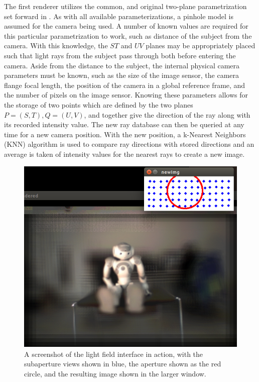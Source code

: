 \documentclass[12pt]{report}
\begin{document}
The first renderer utilizes the common, and original two-plane parametrization set forward in \cite{Levoy96}. As with all available parameterizations, a pinhole model is assumed for the camera being used. A number of known values are required for this particular parametrization to work, such as distance of the subject from the camera. With this knowledge, the $ST$ and $UV$ planes may be appropriately placed such that light rays from the subject pass through both before entering the camera. Aside from the distance to the subject, the internal physical camera parameters must be known, such as the size of the image sensor, the camera flange focal length, the position of the camera in a global reference frame, and the number of pixels on the image sensor. Knowing these parameters allows for the storage of two points which are defined by the two planes $P=(S,T), Q=(U,V)$, and together give the direction of the ray along with its recorded intensity value. The new ray database can then be queried at any time for a new camera position. With the new position, a k-Nearest Neighbors (KNN) algorithm is used to compare ray directions with stored directions and an average is taken of intensity values for the nearest rays to create a new image.
\begin{figure}[!ht]
	\centering
	\includegraphics[scale=0.4]{nau_lf.png}
	\caption{A screenshot of the light field interface in action, with the subaperture views shown in blue, the aperture shown as the red circle, and the resulting image shown in the larger window.}
	\label{fig:light_field_system}
\end{figure}
\end{document}
